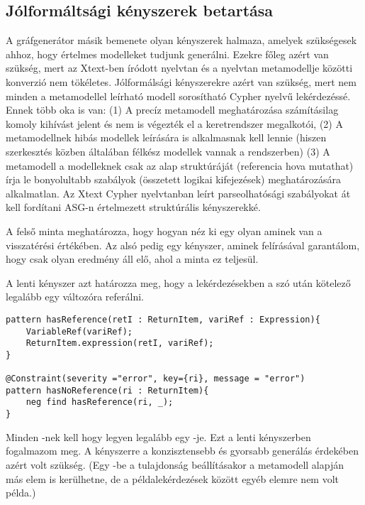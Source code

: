 \subsection{Jólformáltsági kényszerek betartása}
A gráfgenerátor másik bemenete olyan kényszerek halmaza, amelyek szükségesek ahhoz, hogy értelmes modelleket tudjunk generálni. Ezekre főleg azért van szükség, mert az Xtext-ben \cite{xText} íródott nyelvtan és a nyelvtan metamodellje közötti konverzió nem tökéletes. Jólformálsági kényszerekre azért van szükség, mert nem minden a metamodellel leírható modell sorosítható Cypher nyelvű lekérdezéssé. Ennek több oka is van: (1) A precíz metamodell meghatározása számításilag komoly kihívást jelent és nem is végezték el a keretrendszer megalkotói, (2) A metamodellnek hibás modellek leírására is alkalmasnak kell lennie (hiszen szerkesztés közben általában félkész modellek vannak a rendszerben) (3) A metamodell a modelleknek csak az alap struktúráját (referencia hova mutathat) írja le bonyolultabb szabályok (összetett logikai kifejezések) meghatározására alkalmatlan.
 Az Xtext Cypher nyelvtanban leírt parseolhatósági szabályokat át kell fordítani ASG-n értelmezett struktúrális kényszerekké. 




A felső minta meghatározza, hogy hogyan néz ki egy olyan  aminek van  a visszatérési értékében. Az alsó pedig egy kényszer, aminek felírásával garantálom, hogy csak olyan eredmény áll elő, ahol a minta ez teljesül.

A lenti kényszer azt határozza meg, hogy a lekérdezésekben a  szó után kötelező legalább egy változóra referálni.


\begin{lstlisting}[style=viatrasmall]
pattern hasReference(retI : ReturnItem, variRef : Expression){
	VariableRef(variRef);
	ReturnItem.expression(retI, variRef);
}

@Constraint(severity ="error", key={ri}, message = "error")
pattern hasNoReference(ri : ReturnItem){
	neg find hasReference(ri, _);
}
\end{lstlisting}
Minden -nek kell hogy legyen legalább egy -je. Ezt a lenti kényszerben fogalmazom meg. A kényszerre a konzisztensebb és gyorsabb generálás érdekében azért volt szükség. (Egy -be a  tulajdonság beállításakor a metamodell alapján más elem  is kerülhetne, de a példalekérdezések között egyéb elemre nem volt példa.) 

